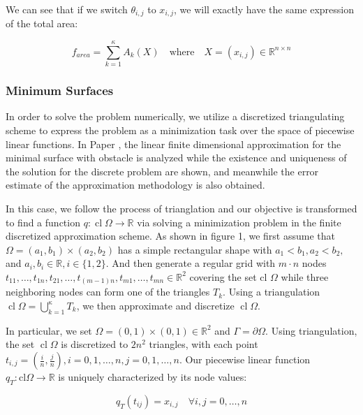We can see that if we switch $\theta_{i,j}$ to $x_{i,j}$, we will exactly have the same expression of the total area:

\begin{equation}
    f_{area} = \sum\limits^{\kappa}_{k=1}A_{k}(X) \quad \text{where} \quad X=\left(x_{i, j}\right) \in \mathbb{R}^{n \times n}
\end{equation}


\subsubsection{Minimum Surfaces}
In order to solve the problem numerically, we utilize a discretized triangulating scheme to express the problem as a minimization task over the space of piecewise linear functions. In Paper \cite{shen1992finite}, the linear finite dimensional approximation for the minimal surface with obstacle is analyzed while the existence and uniqueness of the solution for the discrete problem are shown, and meanwhile the error estimate of the approximation methodology is also obtained. 

In this case, we follow the process of trianglation and our objective is transformed to find a function  $q: \operatorname{cl} \Omega \rightarrow \mathbb{R}$ via solving a minimization problem in the finite discretized approximation scheme. As shown in figure 1, we first assume that $\Omega=\left(a_{1}, b_{1}\right) \times\left(a_{2}, b_{2}\right)$ has a simple rectangular shape with $a_{1}<b_{1}, a_{2}<b_{2},$ and $a_{i}, b_{i} \in \mathbb{R}, i \in\{1,2\} .$ And then generate a regular grid with $m \cdot n$ nodes $t_{11}, \ldots, t_{1 n}, t_{21}, \ldots, t_{(m-1) n}, t_{m 1}, \ldots, t_{m n} \in \mathbb{R}^{2}$
covering the set cl $\Omega$ while three neighboring nodes can form one of the triangles $T_{k} .$ Using a triangulation $\operatorname{cl} \Omega=\bigcup_{k=1}^{\kappa} T_{k}$, we then approximate and discretize $\operatorname{cl} \Omega$.

In particular, we set $\Omega=(0,1) \times(0,1) \in \mathbb R^{2}$ and $\Gamma=\partial \Omega$. Using triangulation, the set $\operatorname{cl} \Omega$ is discretized to $2 n^{2}$ triangles, with each point $t_{i, j}=\left(\frac{i}{n}, \frac{j}{n}\right), i=0,1, \ldots, n, j=0,1, \ldots, n .$ Our piecewise linear function $q_{T}: \mathrm{cl} \Omega \rightarrow \mathbb{R}$ is uniquely characterized by its node values:

\begin{equation}
    q_{T}\left(t_{i j}\right)=x_{i, j} \quad \forall i, j=0, \ldots, n
\end{equation}

